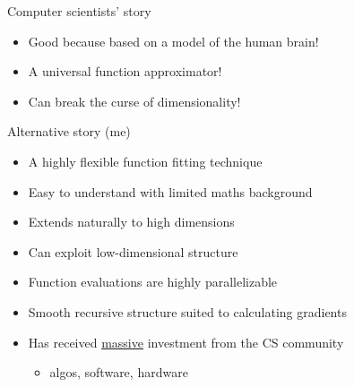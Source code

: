 \begin{frame}{Computer scientists' story}

    \begin{itemize}
        \item Good because based on a model of the human brain! 
        \vspace{0.5em}
        \vspace{0.5em}
        \item A universal function approximator!
        \vspace{0.5em}
        \vspace{0.5em}
        \item Can break the curse of dimensionality!
    \end{itemize}


\end{frame}

\begin{frame}{Alternative story (me)}


    \begin{itemize}
        \item A highly flexible function fitting technique 
        \vspace{0.5em}
        \item Easy to understand with limited maths background
        \vspace{0.5em}
        \item Extends naturally to high dimensions 
        \vspace{0.5em}
        \item Can exploit low-dimensional structure
        \vspace{0.5em}
        \item Function evaluations are highly parallelizable
        \vspace{0.5em}
        \item Smooth recursive structure suited to calculating gradients
        \vspace{0.5em}
        \item Has received \underline{massive} investment from the CS community
            \begin{itemize}
                \vspace{0.5em}
                \item algos, software, hardware
            \end{itemize}
    \end{itemize}

\end{frame}

